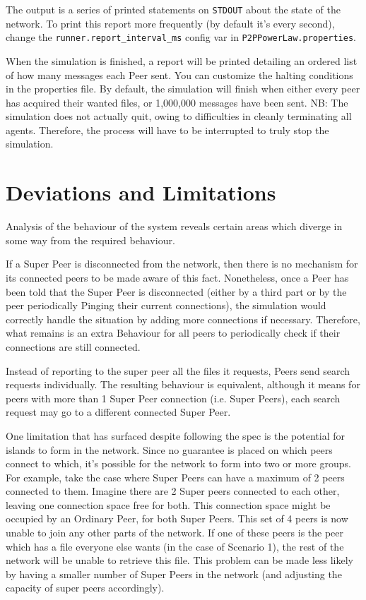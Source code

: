 The output is a series of printed statements on \verb!STDOUT! about the state
of the network.  To print this report more frequently (by default it's every
second), change the \verb!runner.report_interval_ms! config var in
\verb!P2PPowerLaw.properties!.

When the simulation is finished, a report will be printed detailing an ordered
list of how many messages each Peer sent. You can customize the halting
conditions in the properties file. By default, the simulation will finish when
either every peer has acquired their wanted files, or 1\@,000\@,000 messages
have been sent. NB: The simulation does not actually quit, owing to
difficulties in cleanly terminating all agents. Therefore, the process will
have to be interrupted to truly stop the simulation.

\section{Deviations and Limitations}
Analysis of the behaviour of the system reveals certain areas which diverge in
some way from the required behaviour.

If a Super Peer is disconnected from the network, then there is no mechanism
for its connected peers to be made aware of this fact.  Nonetheless, once a
Peer has been told that the Super Peer is disconnected (either by a third part
or by the peer periodically Pinging their current connections), the simulation
would correctly handle the situation by adding more connections if necessary.
Therefore, what remains is an extra Behaviour for all peers to periodically
check if their connections are still connected.

Instead of reporting to the super peer all the files it requests, Peers send
search requests individually. The resulting behaviour is equivalent, although
it means for peers with more than 1 Super Peer connection (i.e. Super Peers),
each search request may go to a different connected Super Peer.

One limitation that has surfaced despite following the spec is the potential
for islands to form in the network. Since no guarantee is placed on which
peers connect to which, it's possible for the network to form into two or more
groups.  For example, take the case where Super Peers can have a maximum of 2
peers connected to them. Imagine there are 2 Super peers connected to each
other, leaving one connection space free for both.  This connection space
might be occupied by an Ordinary Peer, for both Super Peers.  This set of 4
peers is now unable to join any other parts of the network.  If one of these
peers is the peer which has a file everyone else wants (in the case of
Scenario 1), the rest of the network will be unable to retrieve this file.
This problem can be made less likely by having a smaller number of Super Peers
in the network (and adjusting the capacity of super peers accordingly).

